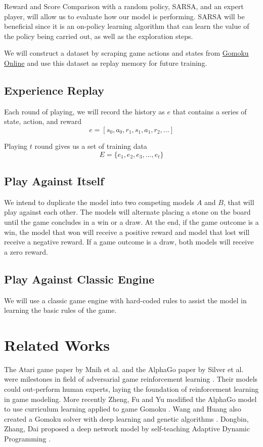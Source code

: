 \documentclass[conference]{IEEEtran}
\begin{document}
Reward and Score Comparison with a random policy, SARSA, and an expert player, will allow us to evaluate how our model is performing. SARSA will be beneficial since it is an on-policy learning algorithm that can learn the value of the policy being carried out, as well as the exploration steps.

We will construct a dataset by scraping game actions and states from \href{https://gomokuonline.com}{Gomoku Online} and use this dataset as replay memory for future training.

\subsection{Experience Replay}
Each round of playing, we will record the history as $e$ that contains a series of state, action, and reward
$$e = [s_0, a_0, r_1, s_1, a_1, r_2, ...]$$

Playing $t$ round gives us a set of training data
$$E = \{e_1, e_2, e_3, ..., e_t\}$$

\subsection{Play Against Itself}
We intend to duplicate the model into two competing models $A$ and $B$, that will play against each other. The models will alternate placing a stone on the board until the game concludes in a win or a draw. At the end, if the game outcome is a win, the model that won will receive a positive reward and model that lost will receive a negative reward. If a game outcome is a draw, both models will receive a zero reward.

\subsection{Play Against Classic Engine}
We will use a classic game engine with hard-coded rules to assist the model in learning the basic rules of the game.

\section{Related Works}\label{AA}
The Atari game paper by Mnih et al. and the AlphaGo paper by Silver et al. were milestones in field of adversarial game reinforcement learning \cite{b1, b2}. Their models could out-perform human experts, laying the foundation of reinforcement learning in game modeling. More recently Zheng, Fu and Yu modified the AlphaGo model to use curriculum learning applied to game Gomoku \cite{b3}. Wang and Huang also created a Gomoku solver with deep learning and genetic algorithms \cite{b5}. Dongbin, Zhang, Dai proposed a deep network model by self-teaching Adaptive Dynamic Programming \cite{b6}.
\end{document}
